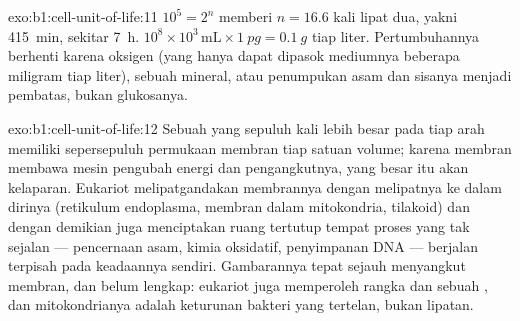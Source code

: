 \begin{solution}{exo:b1:cell-unit-of-life:11}
$10^5 = 2^{n}$ memberi $n = 16.6$ kali lipat dua, yakni \qty{415}{min},
sekitar
\qty{7}{h}. $10^8\times 10^3\,\mathrm{mL}\times\qty{1}{pg} = \qty{0.1}{g}$
tiap liter. Pertumbuhannya berhenti karena oksigen (yang hanya dapat
dipasok mediumnya beberapa miligram tiap liter), sebuah mineral, atau
penumpukan asam dan sisanya menjadi pembatas, bukan glukosanya.
\end{solution}

\begin{solution}{exo:b1:cell-unit-of-life:12}
Sebuah  yang sepuluh kali lebih besar pada tiap arah memiliki
sepersepuluh permukaan membran tiap satuan volume; karena membran
membawa mesin pengubah energi dan pengangkutnya,  yang besar itu akan
kelaparan. Eukariot melipatgandakan membrannya dengan melipatnya ke
dalam dirinya (retikulum endoplasma, membran dalam mitokondria,
tilakoid) dan dengan demikian juga menciptakan ruang tertutup tempat
proses yang tak sejalan --- pencernaan asam, kimia oksidatif,
penyimpanan DNA --- berjalan terpisah pada keadaannya sendiri.
Gambarannya tepat sejauh menyangkut membran, dan belum lengkap: eukariot
juga memperoleh rangka  dan sebuah , dan mitokondrianya adalah
keturunan bakteri yang tertelan, bukan lipatan.
\end{solution}


